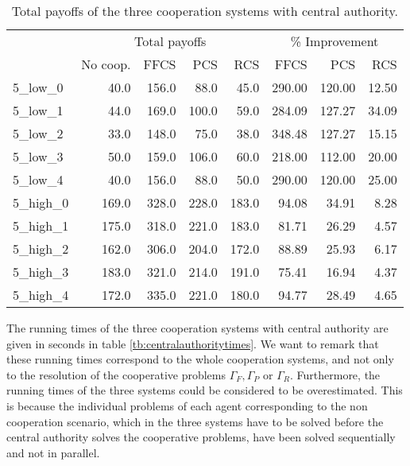 \documentclass{article}
\begin{document}
\begin{table}[ht!]
\centering
\caption{Total payoffs of the three cooperation systems with central authority. \label{tb:centralauthoritypayoff}}
\begin{tabular}{lrrrrrrr}
\toprule
 & \multicolumn{4}{c|}{Total payoffs} & \multicolumn{3}{c}{\% Improvement}\\
 & No coop.  &  FFCS &   PCS &  \multicolumn{1}{r|}{RCS} &   FFCS &   PCS &  RCS \\
\midrule
5\_low\_0  & 40.0  & 156.0 & 88.0  & 45.0  & 290.00 & 120.00 & 12.50 \\
5\_low\_1  & 44.0  & 169.0 & 100.0 & 59.0  & 284.09 & 127.27 & 34.09 \\
5\_low\_2  & 33.0  & 148.0 & 75.0  & 38.0  & 348.48 & 127.27 & 15.15 \\
5\_low\_3  & 50.0  & 159.0 & 106.0 & 60.0  & 218.00 & 112.00 & 20.00 \\
5\_low\_4  & 40.0  & 156.0 & 88.0  & 50.0  & 290.00 & 120.00 & 25.00 \\
5\_high\_0 & 169.0 & 328.0 & 228.0 & 183.0 & 94.08  & 34.91  & 8.28  \\
5\_high\_1 & 175.0 & 318.0 & 221.0 & 183.0 & 81.71  & 26.29  & 4.57  \\
5\_high\_2 & 162.0 & 306.0 & 204.0 & 172.0 & 88.89  & 25.93  & 6.17  \\
5\_high\_3 & 183.0 & 321.0 & 214.0 & 191.0 & 75.41  & 16.94  & 4.37  \\
5\_high\_4 & 172.0 & 335.0 & 221.0 & 180.0 & 94.77  & 28.49  & 4.65 \\
\bottomrule
\end{tabular}
\end{table}

The running times of the three cooperation systems with central authority are given in seconds in table \ref{tb:centralauthoritytimes}. We want to remark that these running times correspond to the whole cooperation systems, and not only to the resolution of the cooperative problems $\Gamma_F,\Gamma_P$ or $\Gamma_R$. Furthermore, the running times of the three systems could be considered to be overestimated. This is because the individual problems of each agent corresponding to the non cooperation scenario, which in the three systems have to be solved before the central authority solves the cooperative problems, have been solved sequentially and not in parallel. 
\end{document}

